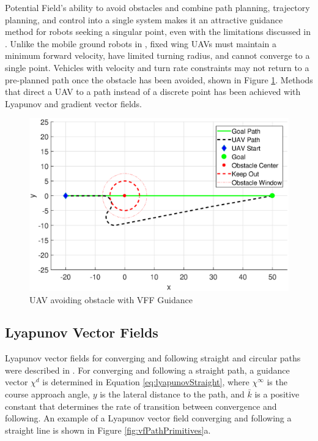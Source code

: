 \documentclass[numbered,pdftex]{ohio-etd}
\begin{document}
Potential Field's ability to avoid obstacles and combine path planning, trajectory planning, and control into a single system makes it an attractive guidance method for robots seeking a singular point, even with the limitations discussed in \cite{koren_potential_1991}. Unlike the mobile ground robots in \cite{borenstein_real-time_1990}, fixed wing UAVs must maintain a minimum forward velocity, have limited turning radius, and cannot converge to a single point. Vehicles with velocity and turn rate constraints may not return to a pre-planned path once the obstacle has been avoided, shown in Figure \ref{fig:vffSimulated}. Methods that direct a UAV to a path instead of a discrete point has been achieved with Lyapunov and gradient vector fields. 


\begin{figure}[H]
	\centering
	\includegraphics[width=15cm]{PaperFigures/Literature/vffSimulated}
	\caption{UAV avoiding obstacle with VFF Guidance}
	\label{fig:vffSimulated}
\end{figure}



\subsection{Lyapunov Vector Fields}
Lyapunov vector fields for converging and following straight and circular paths were described in \cite{nelson_cooperative_2005}. For converging and following a straight path, a guidance vector $\chi^{d}$ is determined in Equation \ref{eq:lyapunovStraight}, where $\chi^{\infty}$ is the course approach angle, $y$ is the lateral distance to the path, and $\bar{k}$ is a positive constant that determines the rate of transition between convergence and following. An example of a Lyapunov vector field converging and following a straight line is shown in Figure \ref{fig:vfPathPrimitives}a.
\end{document}

